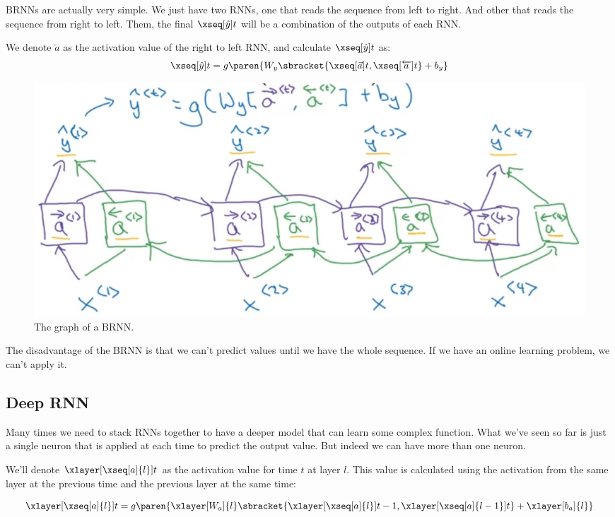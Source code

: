 \documentclass[12pt, a4paper, oneside]{book}
\begin{document}
BRNNs are actually very simple. We just have two RNNs, one that reads the
sequence from left to right. And other that reads the sequence from right to
left. Them, the final $\xseq[\hat{y}]{t}$ will be a combination of the outputs
of each RNN.

We denote $\overleftarrow{a}$ as the activation value of the right to left RNN,
and calculate $\xseq[\hat{y}]{t}$ as:
\[
\xseq[\hat{y}]{t}=
g\paren{W_y\sbracket{\xseq[\vec{a}]{t}, \xseq[\overleftarrow{a}]{t}}+b_y}
\]

\begin{figure}[h]
\centering
\includegraphics[scale=0.5]{Res/BRNN.jpg}
\caption{The graph of a BRNN.}
\label{BR}
\end{figure}

The disadvantage of the BRNN is that we can't predict values until we have the
whole sequence. If we have an online learning problem, we can't apply it.

\subsection{Deep RNN}%
\label{sub:deep_rnn}

Many times we need to stack RNNs together to have a deeper model that can learn
some complex function. What we've seen so far is just a single neuron that is
applied at each time to predict the output value. But indeed we can have more
than one neuron.

We'll denote $\xlayer[\xseq[a]{l}]{t}$ as the activation value for time $t$ at
layer $l$. This value is calculated using the activation from the same layer at
the previous time and the previous layer at the same time:

\[
\xlayer[\xseq[a]{l}]{t}=
g\paren{\xlayer[W_a]{l}\sbracket{
\xlayer[\xseq[a]{l}]{t-1},\xlayer[\xseq[a]{l-1}]{t}
}
+\xlayer[b_a]{l}}
\]
\end{document}

